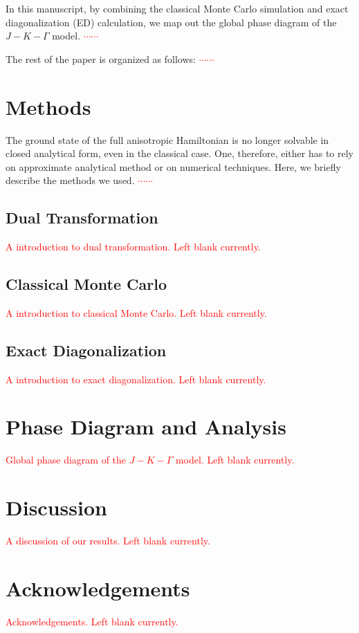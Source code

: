 \documentclass[aps,prb,reprint,groupedaddress,showpacs,amsfonts,amsmath,amssymb,superscriptaddress]{revtex4-1}
\begin{document}
In this manuscript, by combining the classical Monte Carlo simulation and exact diagonalization (ED) calculation, we map out the global phase diagram of the $J-K-\Gamma$ model. \textcolor{red}{$\cdots\cdots$}

The rest of the paper is organized as follows: \textcolor{red}{$\cdots\cdots$}

\section{Methods}

The ground state of the full anisotropic Hamiltonian is no longer solvable in closed analytical form, even in the classical case. One, therefore, either has to rely on approximate analytical method or on numerical techniques. Here, we briefly describe the methods we used. \textcolor{red}{$\cdots\cdots$}

\subsection{Dual Transformation}
\textcolor{red}{A introduction to dual transformation. Left blank currently.}

\subsection{Classical Monte Carlo}
\textcolor{red}{A introduction to classical Monte Carlo. Left blank currently.}

\subsection{Exact Diagonalization}
\textcolor{red}{A introduction to exact diagonalization. Left blank currently.}

\section{Phase Diagram and Analysis}
\textcolor{red}{Global phase diagram of the $J-K-\Gamma$ model. Left blank currently.}

\section{Discussion}
\textcolor{red}{A discussion of our results. Left blank currently.}

\section{Acknowledgements}
\textcolor{red}{Acknowledgements. Left blank currently.}


\end{document}
